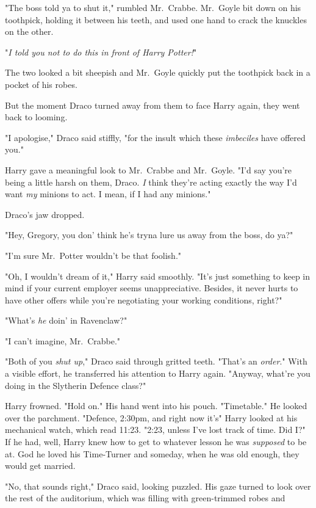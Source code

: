 "The boss told ya to shut it," rumbled Mr.~Crabbe. Mr.~Goyle bit down on his
toothpick, holding it between his teeth, and used one hand to crack the
knuckles on the other.

"\emph{I told you not to do this in front of Harry Potter!}"

The two looked a bit sheepish and Mr.~Goyle quickly put the toothpick back in a
pocket of his robes.

But the moment Draco turned away from them to face Harry again, they went back
to looming.

"I apologise," Draco said stiffly, "for the insult which these \emph{imbeciles}
have offered you."

Harry gave a meaningful look to Mr.~Crabbe and Mr.~Goyle. "I'd say you're being
a little harsh on them, Draco. \emph{I} think they're acting exactly the way
I'd want \emph{my} minions to act. I mean, if I had any minions."

Draco's jaw dropped.

"Hey, Gregory, you don' think he's tryna lure us away from the boss, do ya?"

"I'm sure Mr.~Potter wouldn't be that foolish."

"Oh, I wouldn't dream of it," Harry said smoothly. "It's just something to keep
in mind if your current employer seems unappreciative. Besides, it never hurts
to have other offers while you're negotiating your working conditions, right?"

"What's \emph{he} doin' in Ravenclaw?"

"I can't imagine, Mr.~Crabbe."

"Both of you \emph{shut up}," Draco said through gritted teeth. "That's an
\emph{order}." With a visible effort, he transferred his attention to Harry
again. "Anyway, what're you doing in the Slytherin Defence class?"

Harry frowned. "Hold on." His hand went into his pouch. "Timetable." He looked
over the parchment. "Defence, 2:30pm, and right now it's{\el}" Harry looked
at his mechanical watch, which read 11:23. "2:23, unless I've lost track of
time. Did I?" If he had, well, Harry knew how to get to whatever lesson he was
\emph{supposed} to be at. God he loved his Time-Turner and someday, when he was
old enough, they would get married.

"No, that sounds right," Draco said, looking puzzled. His gaze turned to look
over the rest of the auditorium, which was filling with green-trimmed robes
and{\el}

